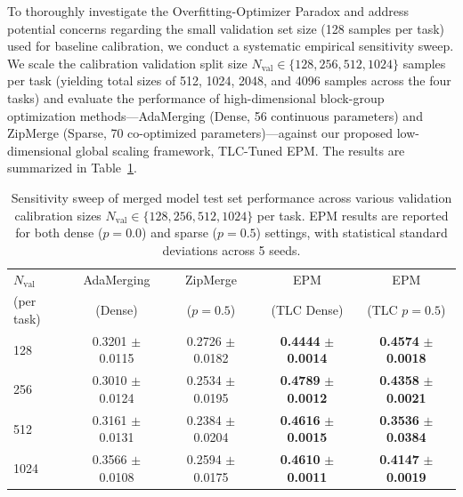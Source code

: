 To thoroughly investigate the Overfitting-Optimizer Paradox and address potential concerns regarding the small validation set size (128 samples per task) used for baseline calibration, we conduct a systematic empirical sensitivity sweep. We scale the calibration validation split size $N_{\text{val}} \in \{128, 256, 512, 1024\}$ samples per task (yielding total sizes of 512, 1024, 2048, and 4096 samples across the four tasks) and evaluate the performance of high-dimensional block-group optimization methods---AdaMerging (Dense, 56 continuous parameters) and ZipMerge (Sparse, 70 co-optimized parameters)---against our proposed low-dimensional global scaling framework, TLC-Tuned EPM. The results are summarized in Table~\ref{tab:val_size_sweep}.

\begin{table}[htbp]
\caption{Sensitivity sweep of merged model test set performance across various validation calibration sizes $N_{\text{val}} \in \{128, 256, 512, 1024\}$ per task. EPM results are reported for both dense ($p=0.0$) and sparse ($p=0.5$) settings, with statistical standard deviations across 5 seeds.}
\label{tab:val_size_sweep}
\vskip 0.15in
\begin{center}
\begin{small}
\begin{sc}
\begin{tabular}{lcccc}
\toprule
$N_{\text{val}}$ & AdaMerging & ZipMerge & EPM & EPM \\
(per task) & (Dense) & ($p=0.5$) & (TLC Dense) & (TLC $p=0.5$) \\
\midrule
128  & 0.3201 $\pm$ 0.0115 & 0.2726 $\pm$ 0.0182 & \textbf{0.4444} $\pm$ \textbf{0.0014} & \textbf{0.4574} $\pm$ \textbf{0.0018} \\
256  & 0.3010 $\pm$ 0.0124 & 0.2534 $\pm$ 0.0195 & \textbf{0.4789} $\pm$ \textbf{0.0012} & \textbf{0.4358} $\pm$ \textbf{0.0021} \\
512  & 0.3161 $\pm$ 0.0131 & 0.2384 $\pm$ 0.0204 & \textbf{0.4616} $\pm$ \textbf{0.0015} & \textbf{0.3536} $\pm$ \textbf{0.0384} \\
1024 & 0.3566 $\pm$ 0.0108 & 0.2594 $\pm$ 0.0175 & \textbf{0.4610} $\pm$ \textbf{0.0011} & \textbf{0.4147} $\pm$ \textbf{0.0019} \\
\bottomrule
\end{tabular}
\end{sc}
\end{small}
\end{center}
\vskip -0.1in
\end{table}

